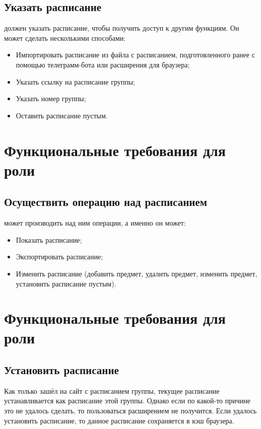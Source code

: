 		\subsection{Указать расписание}
			 должен указать расписание, чтобы получить доступ к другим функциям. Он может сделать несколькими способами:
			\begin{itemize}
				\item Импортировать расписание из файла с расписанием, подготовленного ранее с помощью телеграмм-бота или расширения для браузера;
				
				\item Указать ссылку на расписание группы;
				
				\item Указать номер группы;
				
				\item Оставить расписание пустым.
			\end{itemize}
	\section{Функциональные требования для роли }
		\subsection{Осуществить операцию над расписанием}
			 может производить над ним операции, а именно он может:
			\begin{itemize}
				\item Показать расписание;
				
				\item Экспортировать расписание;
				
				\item Изменить расписание (добавить предмет, удалить предмет, изменить предмет, установить расписание пустым).
			\end{itemize}
	\section{Функциональные требования для роли }
		\subsection{Установить расписание}
			Как только  зашёл на сайт с расписанием группы, текущее расписание устанавливается как расписание этой группы. Однако если по какой-то причине это не удалось сделать, то пользоваться расширением не получится. Если удалось установить расписание, то данное расписание сохраняется в кэш браузера.
			
